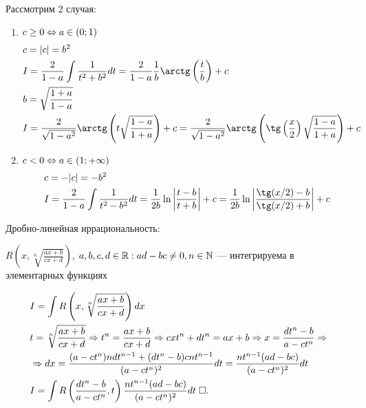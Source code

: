 \documentclass{article}
\begin{document}
\pagebreak

Рассмотрим 2 случая:
\begin{enumerate}
	\item{}$c\geq 0\Leftrightarrow a\in(0;1)$
	\begin{align*}
		 & c=|c|=b^{2}                                                                                         \\
		 & I=\frac{2}{1-a}\int\frac{1}{t^{2}+b^{2}}dt=\frac{2}{1-a}\frac{1}{b}\arctg\left(\frac{t}{b}\right)+c \\
		 & b=\sqrt{\frac{1+a}{1-a}}                                                                            \\
		 & I=\frac{2}{\sqrt{1-a^{2}}}\arctg\left(t\sqrt{\frac{1-a}{1+a}}\right)+c
		=\frac{2}{\sqrt{1-a^{2}}}\arctg\left(\tg\left(\frac{x}{2}\right)\sqrt{\frac{1-a}{1+a}}\right)+c
	\end{align*}
	\item{}$c< 0\Leftrightarrow a\in(1;+\infty)$
	\begin{align*}
		 & c=-|c|=-b^{2}                                                                            \\
		 & I=\frac{2}{1-a}\int\frac{1}{t^{2}-b^{2}}dt=\frac{1}{2b}\ln\left|\frac{t-b}{t+b}\right|+c
		=\frac{1}{2b}\ln\left|\frac{\tg(x/2)-b}{\tg(x/2)+b}\right|+c
	\end{align*}
\end{enumerate}

\theorem

Дробно-линейная иррациональность:

$\displaystyle R\left(x,\sqrt[n]{\frac{ax+b}{cx+d}}\right)$, $a,b,c,d\in\mathbb{R}:ad-bc\neq 0,n\in\mathbb{N}$ --- интегрируема в элементарных функциях

\proof
\begin{align*}
	 & I=\int R\left(x,\sqrt[n]{\frac{ax+b}{cx+d}}\right)dx                                                                      \\
	 & t=\sqrt[n]{\frac{ax+b}{cx+d}}\Rightarrow t^{n}=\frac{ax+b}{cx+d}\Rightarrow cxt^{n}+dt^{n}=ax+b\Rightarrow x=\frac{dt^{n}-b}{a-ct^{n}}\Rightarrow \\
	 & \Rightarrow dx=\frac{(a-ct^{n})ndt^{n-1}+(dt^{n}-b)cnt^{n-1}}{(a-ct^{n})^{2}}dt=\frac{nt^{n-1}(ad-bc)}{(a-ct^{n})^{2}}dt        \\
	 & I=\int R\left(\frac{dt^{n}-b}{a-ct^{n}},t\right)\frac{nt^{n-1}(ad-bc)}{(a-ct^{n})^{2}}dt\;\square.
\end{align*}
\end{document}
